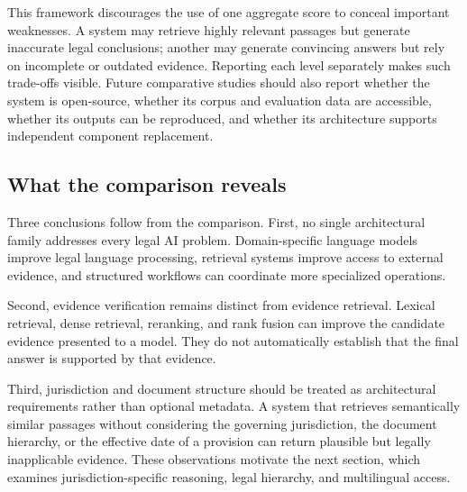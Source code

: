 This framework discourages the use of one aggregate score to conceal important weaknesses. A system may
retrieve highly relevant passages but generate inaccurate legal conclusions; another may generate
convincing answers but rely on incomplete or outdated evidence. Reporting each level separately makes
such trade-offs visible. Future comparative studies should also report whether the system is
open-source, whether its corpus and evaluation data are accessible, whether its outputs can be
reproduced, and whether its architecture supports independent component replacement.

\subsection{What the comparison reveals}

Three conclusions follow from the comparison. First, no single architectural family addresses every
legal AI problem. Domain-specific language models improve legal language processing, retrieval systems
improve access to external evidence, and structured workflows can coordinate more specialized
operations.

Second, evidence verification remains distinct from evidence retrieval. Lexical retrieval, dense
retrieval, reranking, and rank fusion can improve the candidate evidence presented to a model. They do
not automatically establish that the final answer is supported by that evidence.

Third, jurisdiction and document structure should be treated as architectural requirements rather than
optional metadata. A system that retrieves semantically similar passages without considering the
governing jurisdiction, the document hierarchy, or the effective date of a provision can return
plausible but legally inapplicable evidence. These observations motivate the next section, which
examines jurisdiction-specific reasoning, legal hierarchy, and multilingual access.
